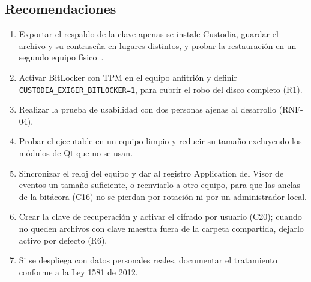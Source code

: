 \documentclass[conference]{IEEEtran}
\begin{document}
\subsection{Recomendaciones}
\begin{enumerate}
    \item Exportar el respaldo de la clave apenas se instale Custodia, guardar el archivo y su contraseña en lugares distintos, y probar la restauración en un segundo equipo físico~\cite{sp80057}.
    \item Activar BitLocker con TPM en el equipo anfitrión y definir \texttt{CUSTODIA\_EXIGIR\_BITLOCKER=1}, para cubrir el robo del disco completo (R1).
    \item Realizar la prueba de usabilidad con dos personas ajenas al desarrollo (RNF-04).
    \item Probar el ejecutable en un equipo limpio y reducir su tamaño excluyendo los módulos de Qt que no se usan.
    \item Sincronizar el reloj del equipo y dar al registro Application del Visor de eventos un tamaño suficiente, o reenviarlo a otro equipo, para que las anclas de la bitácora (C16) no se pierdan por rotación ni por un administrador local.
    \item Crear la clave de recuperación y activar el cifrado por usuario (C20); cuando no queden archivos con clave maestra fuera de la carpeta compartida, dejarlo activo por defecto (R6).
    \item Si se despliega con datos personales reales, documentar el tratamiento conforme a la Ley 1581 de 2012.
\end{enumerate}
\end{document}

